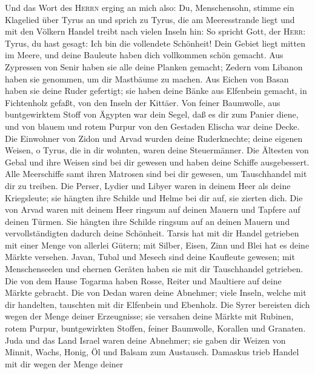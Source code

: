  Und das Wort des \textsc{Herrn} erging an mich also:
 Du, Menschensohn, stimme ein Klagelied über Tyrus an
 und sprich zu Tyrus, die am Meeresstrande liegt und mit
den Völkern Handel treibt nach vielen Inseln hin: So spricht Gott, der
\textsc{Herr}: Tyrus, du hast gesagt: Ich bin die vollendete Schönheit!
 Dein Gebiet liegt mitten im Meere, und deine Bauleute
haben dich vollkommen schön gemacht.  Aus Zypressen von
Senir haben sie alle deine Planken gemacht; Zedern vom Libanon haben sie
genommen, um dir Mastbäume zu machen.  Aus Eichen von
Basan haben sie deine Ruder gefertigt; sie haben deine Bänke aus
Elfenbein gemacht, in Fichtenholz gefaßt, von den Inseln der Kittäer.
 Von feiner Baumwolle, aus buntgewirktem Stoff von Ägypten
war dein Segel, daß es dir zum Panier diene, und von blauem und rotem
Purpur von den Gestaden Elischa war deine Decke.  Die
Einwohner von Zidon und Arvad wurden deine Ruderknechte; deine eigenen
Weisen, o Tyrus, die in dir wohnten, waren deine Steuermänner.
 Die Ältesten von Gebal und ihre Weisen sind bei dir
gewesen und haben deine Schiffe ausgebessert. Alle Meerschiffe samt
ihren Matrosen sind bei dir gewesen, um Tauschhandel mit dir zu treiben.
 Die Perser, Lydier und Libyer waren in deinem Heer als
deine Kriegsleute; sie hängten ihre Schilde und Helme bei dir auf, sie
zierten dich.  Die von Arvad waren mit deinem Heer
ringsum auf deinen Mauern und Tapfere auf deinen Türmen. Sie hängten
ihre Schilde ringsum auf an deinen Mauern und vervollständigten dadurch
deine Schönheit.  Tarsis hat mit dir Handel getrieben mit
einer Menge von allerlei Gütern; mit Silber, Eisen, Zinn und Blei hat es
deine Märkte versehen.  Javan, Tubal und Mesech sind
deine Kaufleute gewesen; mit Menschenseelen und ehernen Geräten haben
sie mit dir Tauschhandel getrieben.  Die von dem Hause
Togarma haben Rosse, Reiter und Maultiere auf deine Märkte gebracht.
 Die von Dedan waren deine Abnehmer; viele Inseln, welche
mit dir handelten, tauschten mit dir Elfenbein und Ebenholz.
 Die Syrer bereisten dich wegen der Menge deiner
Erzeugnisse; sie versahen deine Märkte mit Rubinen, rotem Purpur,
buntgewirkten Stoffen, feiner Baumwolle, Korallen und Granaten.
 Juda und das Land Israel waren deine Abnehmer; sie gaben
dir Weizen von Minnit, Wachs, Honig, Öl und Balsam zum Austausch.
 Damaskus trieb Handel mit dir wegen der Menge deiner
